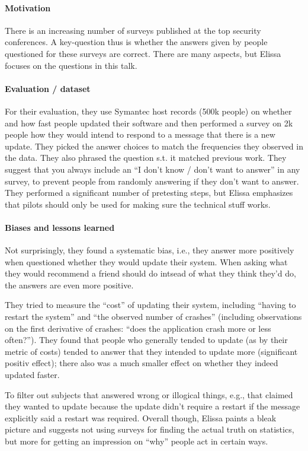 \documentclass{article}
\begin{document}
\paragraph{Motivation}
There is an increasing number of surveys published at the top security conferences. A key-question thus is whether the answers given by people questioned for these surveys are correct. There are many aspects, but Elissa focuses on the questions in this talk.

\paragraph{Evaluation / dataset}
For their evaluation, they use Symantec host records (500k people) on whether and how fast people updated their software and then performed a survey on 2k people how they would intend to respond to a message that there is a new update.
They picked the answer choices to match the frequencies they observed in the data. They also phrased the question s.t. it matched previous work. They suggest that you always include an ``I don't know / don't want to answer'' in any survey, to prevent people from randomly answering if they don't want to answer.
They performed a significant number of pretesting steps, but Elissa emphasizes that pilots should only be used for making sure the technical stuff works.

\paragraph{Biases and lessons learned} Not surprisingly, they found a systematic bias, i.e., they answer more positively when questioned whether they would update their system. When asking what they would recommend a friend should do intsead of what they think they'd do, the answers are even more positive.

They tried to measure the ``cost'' of updating their system, including ``having to restart the system'' and ``the observed number of crashes'' (including observations on the first derivative of crashes: ``does the application crash more or less often?''). They found that people who generally tended to update (as by their metric of costs) tended to answer that they intended to update more (significant positiv effect); there also was a much smaller effect on whether they indeed updated faster.

To filter out subjects that answered wrong or illogical things, e.g., that claimed they wanted to update because the update didn't require a restart if the message explicitly said a restart was required. Overall though, Elissa paints a bleak picture and suggests not using surveys for finding the actual truth on statistics, but more for getting an impression on ``why'' people act in certain ways.















\end{document}
